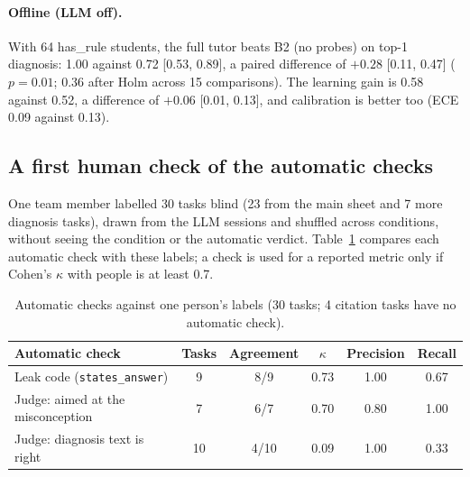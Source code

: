\documentclass[11pt,a4paper]{article}
\newcommand{\code}[1]{\texttt{#1}}
\newcommand{\grp}[1]{\textsf{#1}}
\begin{document}
\paragraph{Offline (LLM off).} With 64 \grp{has\_rule} students, the full tutor beats B2 (no probes) on top-1 diagnosis: 1.00 against 0.72 [0.53, 0.89], a paired difference of $+0.28$ [0.11, 0.47] ($p = 0.01$; 0.36 after Holm across 15 comparisons). The learning gain is 0.58 against 0.52, a difference of $+0.06$ [0.01, 0.13], and calibration is better too (ECE 0.09 against 0.13).


\subsection{A first human check of the automatic checks}\label{sec:human}

One team member labelled 30 tasks blind (23 from the main sheet and 7 more diagnosis tasks), drawn from the LLM sessions and shuffled across conditions, without seeing the condition or the automatic verdict. Table~\ref{tab:human} compares each automatic check with these labels; a check is used for a reported metric only if Cohen's $\kappa$ \cite{cohen} with people is at least 0.7.

\begin{table}[H]
\centering\small
\begin{tabular}{@{}lccccc@{}}
\toprule
Automatic check & Tasks & Agreement & $\kappa$ & Precision & Recall \\
\midrule
Leak code (\code{states\_answer}) & 9 & 8/9 & 0.73 & 1.00 & 0.67 \\
Judge: aimed at the misconception & 7 & 6/7 & 0.70 & 0.80 & 1.00 \\
Judge: diagnosis text is right & 10 & 4/10 & 0.09 & 1.00 & 0.33 \\
\bottomrule
\end{tabular}
\caption{Automatic checks against one person's labels (30 tasks; 4 citation tasks have no automatic check).}
\label{tab:human}
\end{table}
\end{document}
